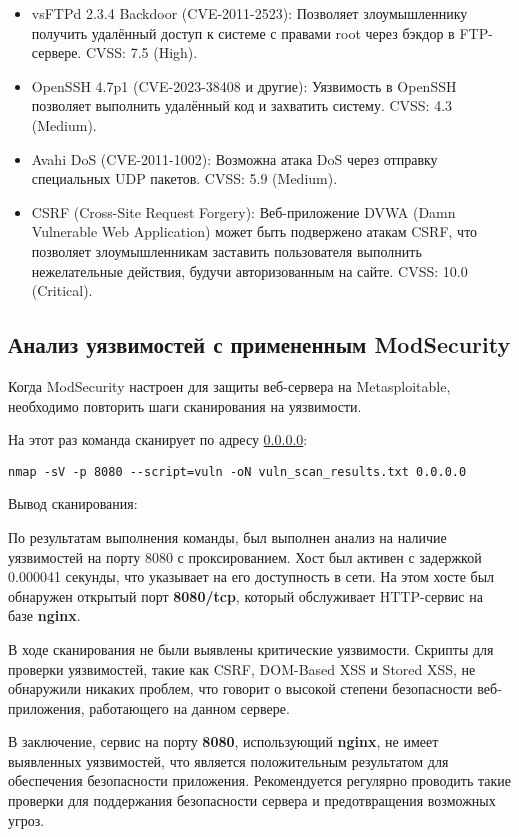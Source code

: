 \begin{itemize}
	\item vsFTPd 2.3.4 Backdoor (CVE-2011-2523):
		Позволяет злоумышленнику получить удалённый доступ
		к системе с правами root через бэкдор в FTP-сервере.
		CVSS: 7.5 (High).
	\item OpenSSH 4.7p1 (CVE-2023-38408 и другие):
		Уязвимость в OpenSSH позволяет выполнить удалённый код
		и захватить систему.
		CVSS: 4.3 (Medium).
	\item Avahi DoS (CVE-2011-1002):
		Возможна атака DoS через отправку специальных UDP пакетов.
		CVSS: 5.9 (Medium).
	\item CSRF (Cross-Site Request Forgery):
		Веб-приложение DVWA (Damn Vulnerable Web Application)
		может быть подвержено атакам CSRF,
		что позволяет злоумышленникам заставить
		пользователя выполнить нежелательные действия,
		будучи авторизованным на сайте.
		CVSS: 10.0 (Critical).
\end{itemize}

\subsection{Анализ уязвимостей с примененным ModSecurity}

Когда ModSecurity настроен для защиты веб-сервера на Metasploitable,
необходимо повторить шаги сканирования на уязвимости.

На этот раз команда сканирует по адресу \url{0.0.0.0}:

\begin{verbatim}
nmap -sV -p 8080 --script=vuln -oN vuln_scan_results.txt 0.0.0.0
\end{verbatim}

Вывод сканирования:



По результатам выполнения команды,
был выполнен анализ на наличие уязвимостей на порту 8080 с проксированием.
Хост был активен с задержкой 0.000041 секунды,
что указывает на его доступность в сети.
На этом хосте был обнаружен открытый порт \textbf{8080/tcp},
который обслуживает HTTP-сервис на базе \textbf{nginx}.\par
В ходе сканирования не были выявлены критические уязвимости.
Скрипты для проверки уязвимостей,
такие как CSRF, DOM-Based XSS и Stored XSS, не обнаружили никаких проблем,
что говорит о высокой степени безопасности веб-приложения,
работающего на данном сервере. \par
В заключение, сервис на порту \textbf{8080}, использующий \textbf{nginx},
не имеет выявленных уязвимостей,
что является положительным результатом для обеспечения безопасности приложения.
Рекомендуется регулярно проводить такие проверки
для поддержания безопасности сервера и предотвращения возможных угроз.

